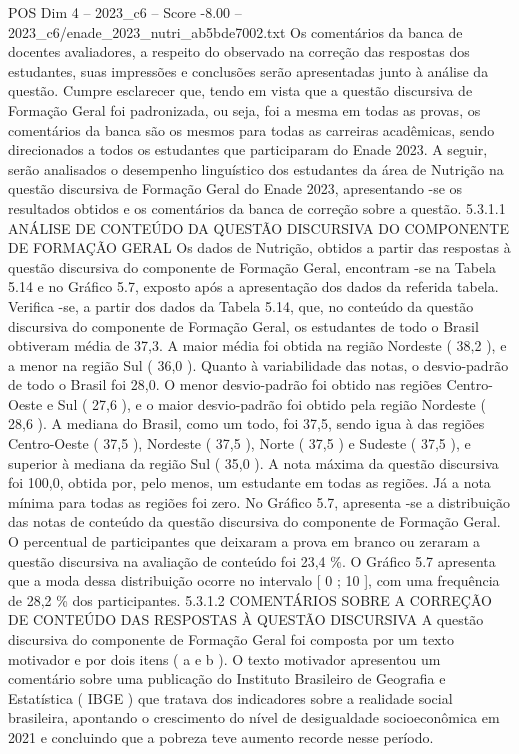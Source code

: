 \begin{textsample}{POS Dim 4 – 2023\_c6 – Score -8.00 – 2023\_c6/enade\_2023\_nutri\_ab5bde7002.txt}
Os comentários da banca de docentes avaliadores, a respeito do observado na correção das respostas dos estudantes, suas impressões e conclusões serão apresentadas junto à análise da questão.
Cumpre esclarecer que, tendo em vista que a questão discursiva de Formação Geral foi padronizada, ou seja, foi a mesma em todas as provas, os comentários da banca são os mesmos para todas as carreiras acadêmicas, sendo direcionados a todos os estudantes que participaram do Enade 2023.
A seguir, serão analisados o desempenho linguístico dos estudantes da área de Nutrição na questão discursiva de Formação Geral do Enade 2023, apresentando -se os resultados obtidos e os comentários da banca de correção sobre a questão. 5.3.1.1 ANÁLISE DE CONTEÚDO DA QUESTÃO DISCURSIVA DO COMPONENTE DE FORMAÇÃO GERAL Os dados de Nutrição, obtidos a partir das respostas à questão discursiva do componente de Formação Geral, encontram -se na Tabela 5.14 e no Gráfico 5.7, exposto após a apresentação dos dados da referida tabela.
Verifica -se, a partir dos dados da Tabela 5.14, que, no conteúdo da questão discursiva do componente de Formação Geral, os estudantes de todo o Brasil obtiveram média de 37,3.
A maior média foi obtida na região Nordeste ( 38,2 ), e a menor na região Sul ( 36,0 ).
Quanto à variabilidade das notas, o desvio-padrão de todo o Brasil foi 28,0.
O menor desvio-padrão foi obtido nas regiões Centro-Oeste e Sul ( 27,6 ), e o maior desvio-padrão foi obtido pela região Nordeste ( 28,6 ).
A mediana do Brasil, como um todo, foi 37,5, sendo igua à das regiões Centro-Oeste ( 37,5 ), Nordeste ( 37,5 ), Norte ( 37,5 ) e Sudeste ( 37,5 ), e superior à mediana da região Sul ( 35,0 ).
A nota máxima da questão discursiva foi 100,0, obtida por, pelo menos, um estudante em todas as regiões.
Já a nota mínima para todas as regiões foi zero.
No Gráfico 5.7, apresenta -se a distribuição das notas de conteúdo da questão discursiva do componente de Formação Geral.
O percentual de participantes que deixaram a prova em branco ou zeraram a questão discursiva na avaliação de conteúdo foi 23,4 \%.
O Gráfico 5.7 apresenta que a moda dessa distribuição ocorre no intervalo [ 0 ; 10 ], com uma frequência de 28,2 \% dos participantes. 5.3.1.2 COMENTÁRIOS SOBRE A CORREÇÃO DE CONTEÚDO DAS RESPOSTAS À QUESTÃO DISCURSIVA A questão discursiva do componente de Formação Geral foi composta por um texto motivador e por dois itens ( a e b ).
O texto motivador apresentou um comentário sobre uma publicação do Instituto Brasileiro de Geografia e Estatística ( IBGE ) que tratava dos indicadores sobre a realidade social brasileira, apontando o crescimento do nível de desigualdade socioeconômica em 2021 e concluindo que a pobreza teve aumento recorde nesse período.

\end{textsample}
